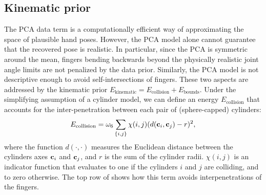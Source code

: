 \subsection*{Kinematic prior}
The PCA data term is a computationally efficient way of approximating the space of plausible hand poses.
However, the PCA model alone cannot guarantee that the recovered pose is realistic. In particular, since the PCA is symmetric around the mean, fingers bending backwards beyond the physically realistic joint angle limits are not penalized by the data prior. Similarly, the PCA model is not descriptive enough to avoid self-intersections of fingers. These two aspects are addressed by the kinematic prior $E_{\text{kinematic}} = E_{\text{collision}} + E_{\text{bounds}}$.
%
%
Under the simplifying assumption of a cylinder model, we can define an energy $E_{\text{collision}}$ that accounts for the inter-penetration between each pair of (sphere-capped) cylinders:
% 
\begin{equation}
    E_{\text{collision}} = \omega_6 \sum_{\{i,j\}} {\chi(i,j)}(d(\mathbf{c}_i, \mathbf{c}_j) - r)^2,
\end{equation} 
%
where the function $d(\cdot,\cdot)$ measures the Euclidean distance between the cylinders axes $\mathbf{c}_i$ and $\mathbf{c}_j$, and $r$ is the sum of the cylinder radii. ${\chi(i,j)}$ is an indicator function that evaluates to one if the cylinders $i$ and $j$ are colliding, and to zero otherwise.
The top row of  shows how this term avoids interpenetrations of the fingers.
% 



